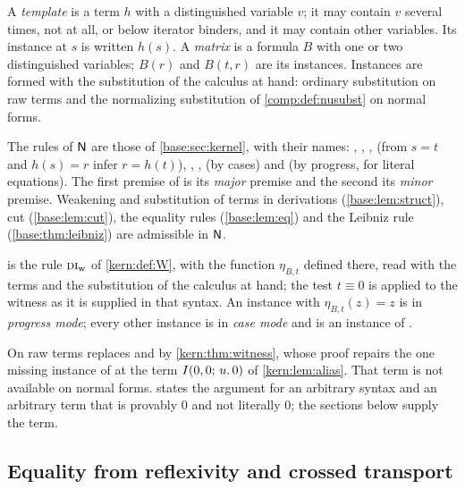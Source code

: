 A \emph{template} is a term $h$ with a distinguished variable $v$; it may
contain $v$ several times, not at all, or below iterator binders, and it may
contain other variables. Its instance at $s$ is written $h(s)$. A
\emph{matrix} is a formula $B$ with one or two distinguished variables;
$B(r)$ and $B(t,r)$ are its instances. Instances are formed with the
substitution of the calculus at hand: ordinary substitution on raw terms and
the normalizing substitution of \cref{comp:def:nusubst} on normal forms.

The rules of $\mathsf{N}$ are those of \cref{base:sec:kernel}, with their names:
, , ,  (from $s=t$ and
$h(s)=r$ infer $r=h(t)$), , ,  (by
cases) and  (by progress, for literal equations). The first
premise of  is its \emph{major} premise and the second its
\emph{minor} premise. Weakening and substitution of terms in derivations
(\cref{base:lem:struct}), cut (\cref{base:lem:cut}), the equality rules
(\cref{base:lem:eq}) and the Leibniz rule (\cref{base:thm:leibniz}) are
admissible in $\mathsf{N}$.

\begin{definition}
\label{comp:def:wi}
 is the rule $\rulename{DI}_{\mathrm{w}}$ of
\cref{kern:def:W}, with the function $\eta_{B,t}$ defined there, read with
the terms and the substitution of the calculus at hand; the test $t\equiv0$
is applied to the witness as it is supplied in that syntax. An instance with
$\eta_{B,t}(z)=z$ is in \emph{progress mode}; every other instance is in
\emph{case mode} and is an instance of .
\end{definition}

On raw terms  replaces  and  by
\cref{kern:thm:witness}, whose proof repairs the one missing instance of
 at the term $I(0,0;\,u.\,0)$ of \cref{kern:lem:alias}. That
term is not available on normal forms.  states the
argument for an arbitrary syntax and an arbitrary term that is provably $0$
and not literally $0$; the sections below supply the term.

\subsection{Equality from reflexivity and crossed transport}

